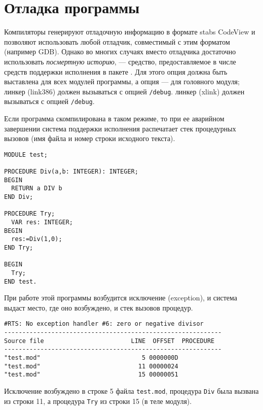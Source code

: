 \fi %

\section{Отладка программы}\label{start:debug}

\ifgencode

Компиляторы \XDS{} генерируют отладочную информацию в формате
\iflinux stabs \else CodeView \fi и позволяют использовать любой 
отладчик, совместимый с этим форматом
\iflinux (например GDB)\fi.  
Однако во многих случаях вместо отладчика достаточно использовать
{\em посмертную историю},
--- средство, предоставляемое в числе средств поддержки исполнения 
в пакете \XDS{}.
Для этого опция  должна быть выставлена для всех модулей
программы, а опция  --- для головного модуля;
\ifosii
линкер (link386) должен вызываться с опцией  \verb'/debug'.
\fi
\ifwinnt
линкер (xlink) должен вызываться с опцией  \verb'/debug'.
\fi

Если программа скомпилирована в таком режиме, то при ее аварийном
завершении система поддержки исполнения распечатает стек процедурных
вызовов (имя файла и номер строки исходного текста).

\Example
\begin{verbatim}
MODULE test;

PROCEDURE Div(a,b: INTEGER): INTEGER;
BEGIN
  RETURN a DIV b
END Div;

PROCEDURE Try;
  VAR res: INTEGER;
BEGIN
  res:=Div(1,0);
END Try;

BEGIN
  Try;
END test.
\end{verbatim}

\noindent
При работе этой программы возбудится исключение (exception), 
и система выдаст место, где оно возбуждено, и стек вызовов процедур.
\pagebreak[3]
\begin{verbatim}
#RTS: No exception handler #6: zero or negative divisor
------------------------------------------------------------
Source file                        LINE  OFFSET  PROCEDURE
------------------------------------------------------------
"test.mod"                            5 0000000D
"test.mod"                           11 00000024
"test.mod"                           15 00000051
\end{verbatim}
Исключение возбуждено в строке 5 файла {\tt test.mod},
процедура {\tt Div} была вызвана из строки 11,
а процедура {\tt Try} из строки 15
(в теле модуля).


